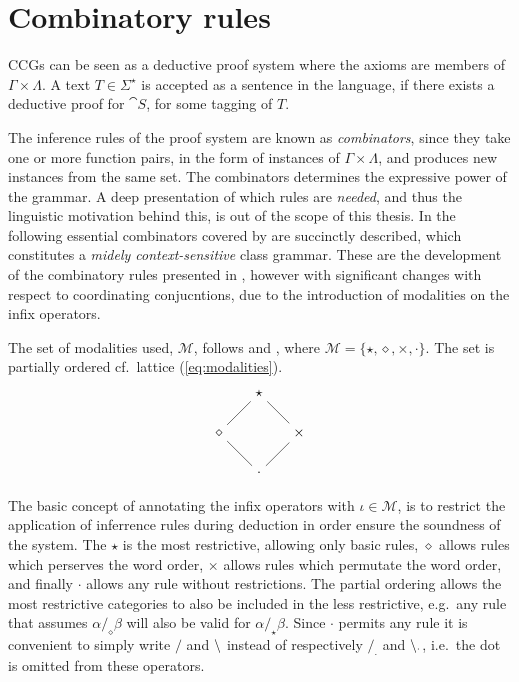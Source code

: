 \section{Combinatory rules}
CCGs can be seen as a deductive proof system where the axioms are members of $\Gamma \times \Lambda$. A text $T \in \Sigma^\star$ is accepted as a sentence in the language, if there exists a deductive proof for $\cat{S}$, for some tagging of $T$.

The inference rules of the proof system are known as \emph{combinators}, since they take one or more function pairs, in the form of instances of $\Gamma \times \Lambda$, and produces new instances from the same set. The combinators determines the expressive power of the grammar. A deep presentation of which rules are \emph{needed}, and thus the linguistic motivation behind this, is out of the scope of this thesis. In the following essential combinators covered by \citeauthor{ts}  are succinctly described, which constitutes a \emph{midely context-sensitive} class grammar. These are the development of the combinatory rules \citeauthor{sp} presented in , however with significant changes with respect to coordinating conjucntions, due to the introduction of modalities on the infix operators. 

The set of modalities used, $\mathcal{M}$, follows \cite{multiModalCCG} and \cite{ts}, where $\mathcal{M} = \{ \star, \diamond, \times, \cdot \}$. The set is partially ordered cf.\ lattice (\ref{eq:modalities}).
\begin{equation}  
  \begin{tikzpicture}
    \tikzstyle{all nodes}=[inner sep=4pt]
    \draw node(*)at(0,1){$\star$}
          node(D)at(-1,0){$\diamond$}                    
          node(X)at(1,0){$\times$}
          node(d)at(0,-1){$\cdot$};
    \draw(*)--(D);
    \draw(*)--(X);
    \draw(D)--(d);
    \draw(X)--(d);
  \end{tikzpicture}
  \label{eq:modalities}
\end{equation}

The basic concept of annotating the infix operators with $\iota \in \mathcal{M}$, is to restrict the application of inferrence rules during deduction in order ensure the soundness of the system. The $\star$ is the most restrictive, allowing only basic rules, $\diamond$ allows rules which perserves the word order, $\times$ allows rules which permutate the word order, and finally $\cdot$ allows any rule without restrictions. The partial ordering allows the most restrictive categories to also be included in the less restrictive, e.g.\ any rule that assumes $\alpha /_\diamond \beta$ will also be valid for $\alpha /_\star \beta$. Since $\cdot$ permits any rule it is convenient to simply write $/$ and $\backslash$ instead of respectively $/_\cdot$ and $\backslash_\cdot$, i.e.\ the dot is omitted from these operators.

